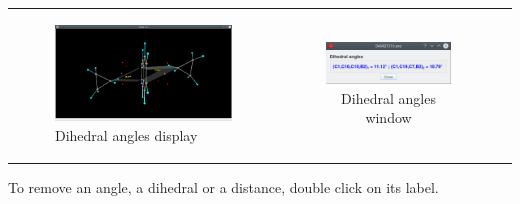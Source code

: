 \documentclass[10pt]{article}
\begin{document}
\begin{tabular}{lcr}
\begin{minipage}{.45\linewidth}
\begin{figure}[H]
\begin{center}
            \includegraphics[width=1\linewidth]{damqt320_dihedrals_2.png}
        \end{center}
        \vspace*{2.5mm}
        \caption[Dihedral angles display]{Dihedral angles display \label{fig:4_2_9}\vspace*{4mm}}
        
    \end{figure}
\end{minipage}
&
\begin{minipage}{.25\linewidth}
    \vspace*{-7mm}
    \begin{figure}[H]
        \begin{center}
            \vspace*{7mm}
            \includegraphics[width=1.\linewidth]{damqt320_dihedrals_3.png}
        \end{center}
        \vspace*{27mm}
        \caption{Dihedral angles window\label{fig:4_2_10}}
    \end{figure}
\end{minipage}
\end{tabular}

\vspace*{5mm}

To remove an angle, a dihedral or a distance, double click on its 
label.
\end{document}
